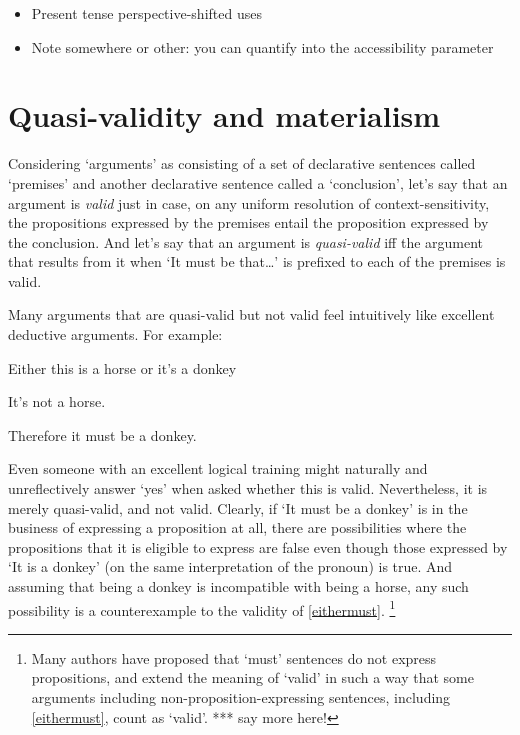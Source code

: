 \documentclass[If.tex]{subfiles}
\begin{document}
\begin{itemize}
	\item
	Present tense perspective-shifted uses
	\item
	Note somewhere or other: you can quantify into the accessibility parameter 
\end{itemize}

\section{Quasi-validity and materialism}
\label{sect:quasivalidity}
Considering ‘arguments’ as consisting of a set of declarative sentences called ‘premises’ and another declarative sentence called a ‘conclusion’, let's say that an argument is \emph{valid} just in case, on any uniform resolution of context-sensitivity, the propositions expressed by the premises entail the proposition expressed by the conclusion. And let's say that an argument is \emph{quasi-valid} iff the argument that results from it when ‘It must be that\ldots{}’ is prefixed to each of the premises is valid. 

Many arguments that are quasi-valid but not valid feel intuitively like excellent deductive arguments. For example:
\begin{prop}
	\nitem \label{eithermust}
		Either this is a horse or it's a donkey

		It's not a horse.

		Therefore it must be a donkey.
\end{prop}
Even someone with an excellent logical training might naturally and unreflectively answer ‘yes’ when asked whether this is valid. Nevertheless, it is merely quasi-valid, and not valid.  Clearly, if ‘It must be a donkey’ is in the business of expressing a proposition at all, there are possibilities where the propositions that it is eligible to express are false even though those expressed by ‘It is a donkey’ (on the same interpretation of the pronoun) is true.  And assuming that being a donkey is incompatible with being a horse, any such possibility is a counterexample to the validity of \ref{eithermust}.%
\footnote{Many authors have proposed that ‘must’ sentences do not express propositions, and extend the meaning of ‘valid’ in such a way that some arguments including non-proposition-expressing sentences, including \ref{eithermust}, count as ‘valid’.  *** say more here!}

\end{document}
